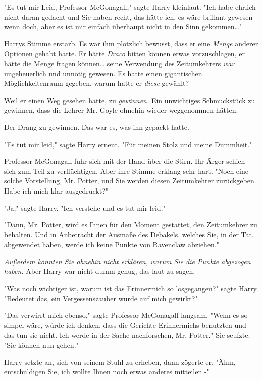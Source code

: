 {"Es tut mir Leid, Professor McGonagall," sagte Harry kleinlaut. "Ich habe ehrlich nicht daran gedacht und Sie haben recht, das hätte ich, es wäre brillant gewesen wenn doch, aber es ist mir einfach überhaupt nicht in den Sinn gekommen…"

Harrys Stimme erstarb. Es war ihm plötzlich bewusst, dass er eine \emph{Menge} anderer Optionen gehabt hatte. Er hätte \emph{Draco} bitten können etwas vorzuschlagen, er hätte die Menge fragen können… seine Verwendung des Zeitumkehrers \emph{war} ungeheuerlich und unnötig gewesen. Es hatte einen gigantischen Möglichkeitenraum gegeben, warum hatte er \emph{diese} gewählt?

Weil er einen Weg gesehen hatte, zu \emph{gewinnen.} Ein unwichtiges Schmuckstück zu gewinnen, dass die Lehrer Mr. Goyle ohnehin wieder weggenommen hätten.

Der Drang zu gewinnen. Das war es, was ihn gepackt hatte.

"Es tut mir leid," sagte Harry erneut. "Für meinen Stolz und meine Dummheit."

Professor McGonagall fuhr sich mit der Hand über die Stirn. Ihr Ärger schien sich zum Teil zu verflüchtigen. Aber ihre Stimme erklang sehr hart. "Noch eine solche Vorstellung, Mr. Potter, und Sie werden diesen Zeitumkehrer zurückgeben. Habe ich mich klar ausgedrückt?"

"Ja," sagte Harry. "Ich verstehe und es tut mir leid."

"Dann, Mr. Potter, wird es Ihnen für den Moment gestattet, den Zeitumkehrer zu behalten. Und in Anbetracht der Ausmaße des Debakels, welches Sie, in der Tat, abgewendet haben, werde ich keine Punkte von Ravenclaw abziehen."

\emph{Außerdem könnten Sie ohnehin nicht erklären, warum Sie die Punkte} \emph{abgezogen haben.} Aber Harry war nicht dumm genug, das laut zu sagen.

"Was noch wichtiger ist, warum ist das Erinnermich so losgegangen?" sagte Harry. "Bedeutet das, ein Vergessenszauber wurde auf mich gewirkt?"

"Das verwirrt mich ebenso," sagte Professor McGonagall langsam. "Wenn es so simpel wäre, würde ich denken, dass die Gerichte Erinnermichs benutzten und das tun sie nicht. Ich werde in der Sache nachforschen, Mr. Potter." Sie seufzte. "Sie können nun gehen."

Harry setzte an, sich von seinem Stuhl zu erheben, dann zögerte er. "Ähm, entschuldigen Sie, ich wollte Ihnen noch etwas anderes mitteilen -"

}

